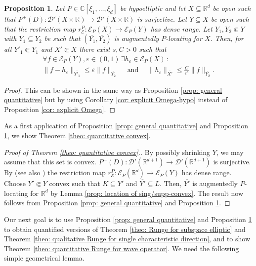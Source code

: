 \documentclass[12pt]{amsart}
\newcommand{\R}{\mathbb{R}}
\newcommand{\C}{\mathbb{C}}
\newtheorem{proposition}[theorem]{Proposition}
\theoremstyle{definition}
\theoremstyle{remark}
\numberwithin{equation}{section}
\begin{document}
\begin{proposition}\label{cor: general quantitative-hypo}
	Let $P\in\C[\xi_1,\ldots,\xi_d]$ be hypoelliptic and let $X\subseteq\R^d$ be open such that $P^+(D): \mathscr{D}'(X\times\R) \to \mathscr{D}'(X\times\R)$ is surjective. Let $Y \subseteq X$ be open such that  the restriction map $r_{\mathscr{E}}^P:\mathscr{E}_P(X)\rightarrow\mathscr{E}_P(Y)$ has dense range.  Let $Y_1, Y_2 \Subset Y$ with $Y_1 \subseteq Y_2$ be such that $(\overline{Y_1}, \overline{Y_2})$ is augmentedly $P$-locating for $X$. Then, for all $Y'_1 \Subset Y_1$ and $X' \Subset X$  there exist $s, C>0$ such that
	\begin{gather*}
		\forall f\in\mathscr{E}_P(Y), \varepsilon\in (0,1) \,\exists h_\varepsilon \in\mathscr{E}_P(X) \, :\\
		\|f-h_\varepsilon\|_{\overline{Y'_1}}\leq \varepsilon\|f\|_{\overline{Y_2}} \quad \mbox{ and } \quad \|h_\varepsilon\|_{\overline{X'}}\leq\frac{C}{\varepsilon^s}\|f\|_{\overline{Y_2}}.
	\end{gather*}
\end{proposition}
\begin{proof}
This can be shown in the same way as Proposition \ref{prop: general quantitative}  but by using  Corollary \ref{cor: explicit Omega-hypo} instead of Proposition \ref{cor: explicit Omega}.
\end{proof}

As a first application of  Proposition \ref{prop: general quantitative} and Proposition \ref{cor: general quantitative-hypo}, we show Theorem \ref{theo: quantitative convex}.
\begin{proof}[Proof of Theorem \ref{theo: quantitative convex}.]
By possibly shrinking $Y$, we may assume that this set is convex. $P^+(D): \mathscr{D}'(\R^{d+1}) \to \mathscr{D}'(\R^{d+1})$ is surjective. By \cite[Chapitre 1.2, Th\'eor\`eme 2]{Malgrange} (see also  \cite[Theorem 10.5.1]{HoermanderPDO2}) the restriction map $r_{\mathscr{E}}^P:\mathscr{E}_P(\R^d)\rightarrow\mathscr{E}_P(Y)$ has dense range. Choose $Y' \Subset Y$ convex such that $K \subseteq Y'$ and $\overline{Y'} \subseteq L$. Then, $\overline{Y'}$ is augmentedly  $P$-locating for $\R^d$ by Lemma \ref{prop: location of sing/supp-convex}. The result now follows from Proposition \ref{prop: general quantitative} and Proposition \ref{cor: general quantitative-hypo}.
\end{proof}
Our next goal is to use Proposition \ref{prop: general quantitative} and Proposition \ref{cor: general quantitative-hypo} to obtain  quantified versions of Theorem \ref{theo: Runge for subspace elliptic} and Theorem \ref{theo: qualitative Runge for single characteristic direction}, and to show Theorem \ref{theo: quantitative Runge for wave operator}. We need the following simple geometrical lemma.
\end{document}

